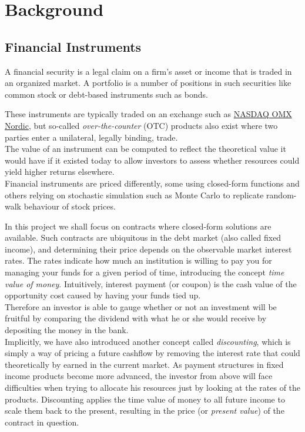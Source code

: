\chapter{Background}

\section{Financial Instruments}

A financial security is a legal claim on a firm's asset or income 
that is traded in an organized market\cite{alexander2008market}.
A portfolio is a number of positions in such securities like common
stock or debt-based instruments such as bonds.

These instruments are typically traded on an exchange such as 
\href{http://www.nasdaqomxnordic.com/}{NASDAQ OMX Nordic}, but so-called
\emph{over-the-counter} (OTC) products also exist where two parties enter
a unilateral, legally binding, trade.\\
The value of an instrument can be computed to reflect the theoretical 
value it would have if it existed today to allow investors to assess
whether resources could yield higher returns elsewhere.\\

Financial instruments are priced differently, some using closed-form functions
and others relying on stochastic simulation such as Monte Carlo to replicate 
random-walk behaviour of stock prices\cite{HULL}.

In this project we shall focus on contracts where closed-form solutions are
available. Such contracts are ubiquitous in the debt market (also called fixed
income), and determining their price depends on the observable market interest
rates. The rates indicate how much an institution is willing to pay you for
managing your funds for a given period of time, introducing the concept
\emph{time value of money}. Intuitively, interest payment (or coupon) is
the cash value of the opportunity cost caused by having your funds tied up.\\
Therefore an investor is able to gauge whether or not an investment will be
fruitful by comparing the dividend with what he or she would receive by 
depositing the money in the bank.\\
Implicitly, we have also introduced another concept called \emph{discounting},
which is simply a way of pricing a future cashflow by removing the interest
rate that could theoretically by earned in the current market. As payment structures
in fixed income products become more advanced, the investor from above will 
face difficulties when trying to allocate his resources just by looking at the
rates of the products. Discounting applies the time value of money to all
future income to scale them back to the present, resulting in the price (or
\emph{present value}) of the contract in question.\\

